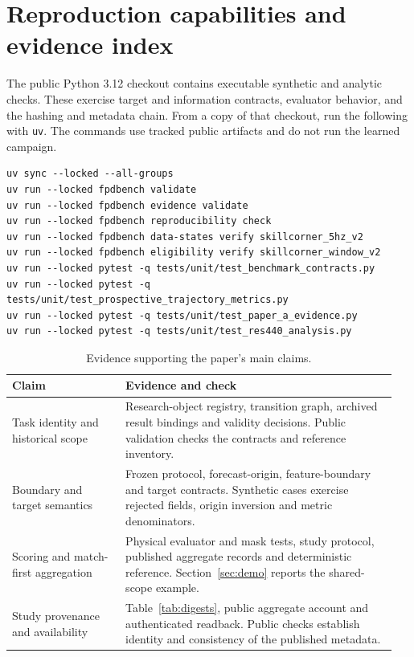 \section{Reproduction capabilities and evidence index}

The public Python 3.12 checkout contains executable synthetic and analytic checks. These exercise target and information contracts, evaluator behavior, and the hashing and metadata chain. From a copy of that checkout, run the following with \texttt{uv}. The commands use tracked public artifacts and do not run the learned campaign.

\begin{verbatim}
uv sync --locked --all-groups
uv run --locked fpdbench validate
uv run --locked fpdbench evidence validate
uv run --locked fpdbench reproducibility check
uv run --locked fpdbench data-states verify skillcorner_5hz_v2
uv run --locked fpdbench eligibility verify skillcorner_window_v2
uv run --locked pytest -q tests/unit/test_benchmark_contracts.py
uv run --locked pytest -q tests/unit/test_prospective_trajectory_metrics.py
uv run --locked pytest -q tests/unit/test_paper_a_evidence.py
uv run --locked pytest -q tests/unit/test_res440_analysis.py
\end{verbatim}

\begin{table}[h]
\centering
\caption{Evidence supporting the paper's main claims.}
\label{tab:evidence}
\begin{tabular}{@{}p{0.28\linewidth}p{0.67\linewidth}@{}}
\toprule
Claim & Evidence and check \\
\midrule
Task identity and historical scope & Research-object registry, transition graph, archived result bindings and validity decisions. Public validation checks the contracts and reference inventory. \\
Boundary and target semantics & Frozen protocol, forecast-origin, feature-boundary and target contracts. Synthetic cases exercise rejected fields, origin inversion and metric denominators. \\
Scoring and match-first aggregation & Physical evaluator and mask tests, study protocol, published aggregate records and deterministic reference. Section~\ref{sec:demo} reports the shared-scope example. \\
Study provenance and availability & Table~\ref{tab:digests}, public aggregate account and authenticated readback. Public checks establish identity and consistency of the published metadata. \\
\bottomrule
\end{tabular}
\end{table}

